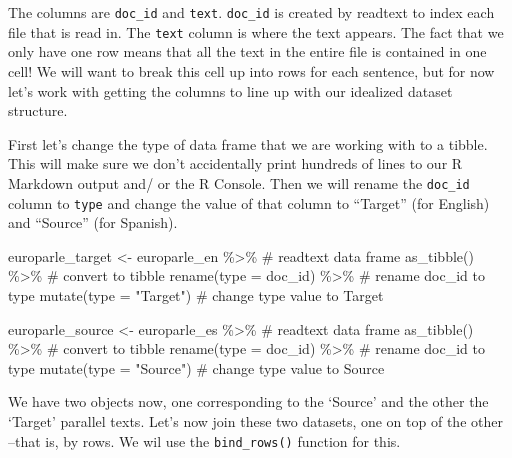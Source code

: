\documentclass[
  letterpaper,
]{latex/krantz}
\newenvironment{Shaded}{\begin{snugshade}}{\end{snugshade}}
\newcommand{\AttributeTok}[1]{\textcolor[rgb]{0.40,0.45,0.13}{#1}}
\newcommand{\CommentTok}[1]{\textcolor[rgb]{0.37,0.37,0.37}{#1}}
\newcommand{\FunctionTok}[1]{\textcolor[rgb]{0.28,0.35,0.67}{#1}}
\newcommand{\NormalTok}[1]{\textcolor[rgb]{0.00,0.23,0.31}{#1}}
\newcommand{\OtherTok}[1]{\textcolor[rgb]{0.00,0.23,0.31}{#1}}
\newcommand{\SpecialCharTok}[1]{\textcolor[rgb]{0.37,0.37,0.37}{#1}}
\newcommand{\StringTok}[1]{\textcolor[rgb]{0.13,0.47,0.30}{#1}}
\begin{document}
The columns are \texttt{doc\_id} and \texttt{text}. \texttt{doc\_id} is
created by readtext to index each file that is read in. The
\texttt{text} column is where the text appears. The fact that we only
have one row means that all the text in the entire file is contained in
one cell! We will want to break this cell up into rows for each
sentence, but for now let's work with getting the columns to line up
with our idealized dataset structure.

First let's change the type of data frame that we are working with to a
tibble. This will make sure we don't accidentally print hundreds of
lines to our R Markdown output and/ or the R Console. Then we will
rename the \texttt{doc\_id} column to \texttt{type} and change the value
of that column to ``Target'' (for English) and ``Source'' (for Spanish).

\begin{Shaded}
\begin{Highlighting}[]
\NormalTok{europarle\_target }\OtherTok{\textless{}{-}} 
\NormalTok{  europarle\_en }\SpecialCharTok{\%\textgreater{}\%} \CommentTok{\# readtext data frame}
  \FunctionTok{as\_tibble}\NormalTok{() }\SpecialCharTok{\%\textgreater{}\%} \CommentTok{\# convert to tibble}
  \FunctionTok{rename}\NormalTok{(}\AttributeTok{type =}\NormalTok{ doc\_id) }\SpecialCharTok{\%\textgreater{}\%} \CommentTok{\# rename doc\_id to type}
  \FunctionTok{mutate}\NormalTok{(}\AttributeTok{type =} \StringTok{"Target"}\NormalTok{) }\CommentTok{\# change type value to \textquotesingle{}Target\textquotesingle{}}

\NormalTok{europarle\_source }\OtherTok{\textless{}{-}} 
\NormalTok{  europarle\_es }\SpecialCharTok{\%\textgreater{}\%} \CommentTok{\# readtext data frame}
  \FunctionTok{as\_tibble}\NormalTok{() }\SpecialCharTok{\%\textgreater{}\%} \CommentTok{\# convert to tibble}
  \FunctionTok{rename}\NormalTok{(}\AttributeTok{type =}\NormalTok{ doc\_id) }\SpecialCharTok{\%\textgreater{}\%} \CommentTok{\# rename doc\_id to type}
  \FunctionTok{mutate}\NormalTok{(}\AttributeTok{type =} \StringTok{"Source"}\NormalTok{) }\CommentTok{\# change type value to \textquotesingle{}Source\textquotesingle{}}
\end{Highlighting}
\end{Shaded}

We have two objects now, one corresponding to the `Source' and the other
the `Target' parallel texts. Let's now join these two datasets, one on
top of the other --that is, by rows. We wil use the
\texttt{bind\_rows()} function for this.
\end{document}
